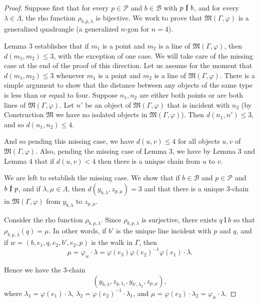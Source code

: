 \documentclass[11pt]{article}
\theoremstyle{definition}
\begin{document}
\begin{proof}
Suppose first that for every $p \in \mathscr{P}$ and $b \in \mathscr{B}$ with $p \  \cancel{\mathrm{I}} \  b$, and for every $\lambda \in \Lambda$, the rho function $\rho_{b,p,\lambda}$ is bijective.  We work to prove that $\mathfrak{M}(\Gamma,\varphi)$ is a generalized quadrangle (a generalized $n$-gon for $n=4$).

Lemma 3 establishes that if $m_1$ is a point and $m_2$ is a line of $\mathfrak{M}(\Gamma,\varphi)$, then $d(m_1,m_2) \leq 3$, with the exception of one case.  We will take care of the missing case at the end of the proof of this direction.  Let us assume for the moment that $d(m_1,m_2) \leq 3$ whenever $m_1$ is a point and $m_2$ is a line of $\mathfrak{M}(\Gamma,\varphi)$.  There is a simple argument to show that the distance between any objects of the same type is less than or equal to four.  Suppose $n_1,n_2$ are either both points or are both lines of $\mathfrak{M}(\Gamma,\varphi)$.  Let $n'$ be an object of $\mathfrak{M}(\Gamma,\varphi)$ that is incident with $n_2$ (by Construction $\mathfrak{M}$ we have no isolated objects in $\mathfrak{M}(\Gamma,\varphi)$).  Then $d(n_1,n') \leq 3$, and so $d(n_1,n_2) \leq 4$.

And so pending this missing case, we have $d(u,v) \leq 4$ for all objects $u,v$ of $\mathfrak{M}(\Gamma,\varphi)$.  Also, pending the missing case of Lemma 3, we have by Lemma 3 and Lemma 4 that if $d(u,v) < 4$ then there is a unique chain from $u$ to $v$.

We are left to establish the missing case.  We show that if $b \in \mathscr{B}$ and $p \in \mathscr{P}$ and $b \  \cancel{\mathrm{I}} \  p$, and if $\lambda, \mu \in \Lambda$, then $d(y_{b,\lambda},z_{p,\mu}) = 3$ and that there is a unique $3$-chain in $\mathfrak{M}(\Gamma,\varphi)$ from $y_{b,\lambda}$ to $z_{p,\mu}$.

Consider the rho function $\rho_{b,p,\lambda}$.  Since $\rho_{b,p,\lambda}$ is surjective, there exists $q \ \mathrm{I} \ b$ so that $\rho_{b,p,\lambda}(q) = \mu$.  In other words, if $b'$ is the unique line incident with $p$ and $q$, and if $w = (b,e_1,q,e_2,b',e_2,p)$ is the walk in $\Gamma$, then $$\mu = \varphi_w \cdot \lambda = \varphi(e_3)\varphi(e_2)^{-1} \varphi(e_1) \cdot \lambda.$$

Hence we have the $3$-chain $$(y_{b,\lambda}, z_{q,\lambda_1}, y_{b',\lambda_2}, z_{p,\mu}),$$ where $\lambda_1 = \varphi(e_1) \cdot \lambda$, $\lambda_2 = \varphi(e_2)^{-1} \cdot \lambda_1$, and $\mu = \varphi(e_3) \cdot \lambda_2 = \varphi_w \cdot \lambda$.


\end{proof}
\end{document}
